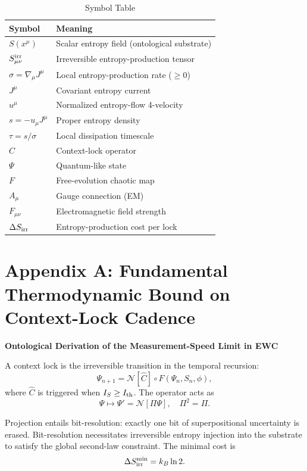 \documentclass[11pt,letterpaper]{article}
\begin{document}
\begin{table}[h]
\centering
\begin{tabular}{ll}
\toprule
Symbol & Meaning \\
\midrule
\(S(x^\mu)\) & Scalar entropy field (ontological substrate) \\
\(S_{\mu\nu}^{\rm irr}\) & Irreversible entropy-production tensor \\
\(\sigma = \nabla_\mu J^\mu\) & Local entropy-production rate (\(\geq 0\)) \\
\(J^\mu\) & Covariant entropy current \\
\(u^\mu\) & Normalized entropy-flow 4-velocity \\
\(s = -u_\mu J^\mu\) & Proper entropy density \\
\(\tau = s / \sigma\) & Local dissipation timescale \\
\(\hat{C}\) & Context-lock operator \\
\(\Psi\) & Quantum-like state \\
\(F\) & Free-evolution chaotic map \\
\(A_\mu\) & Gauge connection (EM) \\
\(F_{\mu\nu}\) & Electromagnetic field strength \\
\(\Delta S_{\rm irr}\) & Entropy-production cost per lock \\
\bottomrule
\end{tabular}
\caption{Symbol Table}
\end{table}

\appendix

\section{Appendix A: Fundamental Thermodynamic Bound on Context-Lock Cadence}
\textbf{Ontological Derivation of the Measurement-Speed Limit in EWC}

A context lock is the irreversible transition in the temporal recursion:
\[
\Psi_{n+1} = \mathcal{N}[\hat{C}] \circ F(\Psi_n, S_n, \phi),
\]
where \(\hat{C}\) is triggered when \(I_S \geq I_{\rm th}\). The operator acts as
\[
\Psi \mapsto \Psi' = \mathcal{N}[\Pi \Psi], \quad \Pi^2 = \Pi.
\]

Projection entails bit-resolution: exactly one bit of superpositional uncertainty is erased. Bit-resolution necessitates irreversible entropy injection into the substrate to satisfy the global second-law constraint. The minimal cost is
\[
\Delta S_{\rm irr}^{\rm min} = k_B \ln 2.
\]
\end{document}
